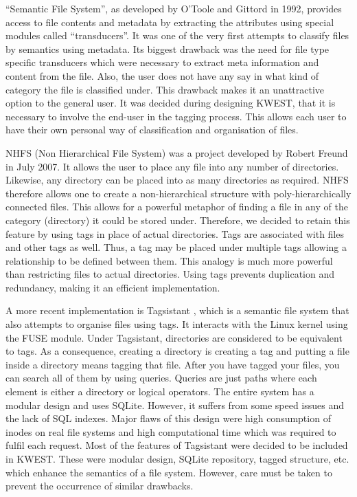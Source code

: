 ``Semantic File System''\cite{SEMFS}, as developed by O'Toole and Gittord in 1992, provides
access to file contents and metadata by extracting the attributes using special modules
called ``transducers''. It was one of the very first attempts to classify files by semantics
using metadata. Its biggest drawback was the need for file type specific transducers
which were necessary to extract meta information and content from the file. Also, the
user does not have any say in what kind of category the file is classified under. This
drawback makes it an unattractive option to the general user. It was decided during
designing KWEST, that it is necessary to involve the end-user in the tagging process. This
allows each user to have their own personal way of classification and organisation of
files.

NHFS (Non Hierarchical File System)\cite{NHFS} was a project developed by Robert Freund
in July 2007. It allows the user to place any file into any number of directories. Likewise,
any directory can be placed into as many directories as required. NHFS therefore allows
one to create a non-hierarchical structure with poly-hierarchically connected files. This
allows for a powerful metaphor of finding a file in any of the category (directory) it could
be stored under. Therefore, we decided to retain this feature by using tags in place of
actual directories. Tags are associated with files and other tags as well. Thus, a tag may
be placed under multiple tags allowing a relationship to be defined between them. This
analogy is much more powerful than restricting files to actual directories. Using tags
prevents duplication and redundancy, making it an efficient implementation.

A more recent implementation is Tagsistant\cite{TAGSISTANT} , which is a semantic file system that
also attempts to organise files using tags. It interacts with the Linux kernel using the
FUSE module. Under Tagsistant, directories are considered to be equivalent to tags. As
a consequence, creating a directory is creating a tag and putting a file inside a directory
means tagging that file. After you have tagged your files, you can search all of them by
using queries. Queries are just paths where each element is either a directory or logical
operators. The entire system has a modular design and uses SQLite. However, it suffers
from some speed issues and the lack of SQL indexes. Major flaws of this design were
high consumption of inodes on real file systems and high computational time which was
required to fulfil each request. Most of the features of Tagsistant were decided to be
included in KWEST. These were modular design, SQLite repository, tagged structure, etc.
which enhance the semantics of a file system. However, care must be taken to prevent
the occurrence of similar drawbacks.

